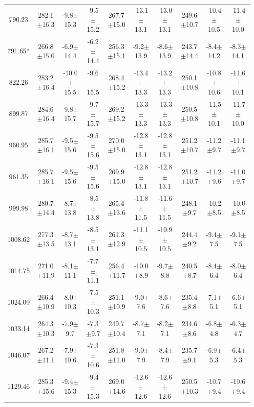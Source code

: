 \documentclass[agupp]{aguplus}              %
\begin{document}
\begin{article}
\begin{center}
\begin{table}[ht]
{\begin{tabular}{c|ccc|ccc|ccc}
790.23 & 282.1$\pm$16.3 & -9.8$\pm$15.3 & -9.5$\pm$15.2 & 267.7$\pm$15.0 & -13.1$\pm$13.1 & -13.0$\pm$13.1 & 249.6$\pm$10.7 & -10.4$\pm$10.5 & -11.4$\pm$10.0 \\ 
791.65* & 266.8$\pm$15.0 & -6.9$\pm$14.4 & -6.2$\pm$14.4 & 256.3$\pm$15.1 & -9.2$\pm$13.9 & -8.6$\pm$13.9 & 243.7$\pm$14.4 & -8.4$\pm$14.2 & -8.3$\pm$14.1 \\ 
\hline
822.26 & 283.2$\pm$16.4 & -10.0$\pm$15.5 & -9.6$\pm$15.5 & 268.4$\pm$15.2 & -13.4$\pm$13.3 & -13.2$\pm$13.3 & 250.1$\pm$10.8 & -10.8$\pm$10.6 & -11.6$\pm$10.1 \\ 
899.87 & 284.6$\pm$16.4 & -9.8$\pm$15.7 & -9.7$\pm$15.7 & 269.2$\pm$15.2 & -13.3$\pm$13.3 & -13.3$\pm$13.3 & 250.5$\pm$10.8 & -11.5$\pm$10.1 & -11.7$\pm$10.0 \\ 
960.95 & 285.7$\pm$16.1 & -9.5$\pm$15.6 & -9.5$\pm$15.6 & 270.0$\pm$15.0 & -12.8$\pm$13.1 & -12.8$\pm$13.1 & 251.2$\pm$10.7 & -11.2$\pm$9.7 & -11.1$\pm$9.7 \\ 
961.35 & 285.7$\pm$16.1 & -9.5$\pm$15.6 & -9.5$\pm$15.6 & 269.9$\pm$15.0 & -12.8$\pm$13.1 & -12.8$\pm$13.1 & 251.2$\pm$10.7 & -11.2$\pm$9.6 & -11.0$\pm$9.7 \\ 
\hline
999.98 & 280.7$\pm$14.4 & -8.7$\pm$13.8 & -8.5$\pm$13.8 & 265.4$\pm$13.6 & -11.8$\pm$11.5 & -11.6$\pm$11.5 & 248.1$\pm$9.7 & -10.2$\pm$8.5 & -10.0$\pm$8.5 \\ 
1008.62 & 277.3$\pm$13.5 & -8.7$\pm$13.1 & -8.5$\pm$13.1 & 261.3$\pm$12.9 & -11.1$\pm$10.5 & -10.9$\pm$10.5 & 244.4$\pm$9.2 & -9.4$\pm$7.5 & -9.1$\pm$7.5 \\ 
1014.75 & 271.0$\pm$11.9 & -8.1$\pm$11.1 & -7.7$\pm$11.1 & 256.4$\pm$11.7 & -10.0$\pm$8.9 & -9.7$\pm$8.8 & 240.5$\pm$8.7 & -8.4$\pm$6.4 & -8.0$\pm$6.4 \\ 
1024.09 & 266.4$\pm$10.9 & -8.0$\pm$10.3 & -7.5$\pm$10.3 & 251.1$\pm$10.9 & -9.0$\pm$7.6 & -8.6$\pm$7.6 & 235.4$\pm$8.8 & -7.1$\pm$5.1 & -6.6$\pm$5.1 \\ 
1033.14 & 264.3$\pm$10.3 & -7.9$\pm$9.7 & -7.3$\pm$9.7 & 249.7$\pm$10.4 & -8.7$\pm$7.1 & -8.2$\pm$7.1 & 234.6$\pm$8.6 & -6.8$\pm$4.8 & -6.3$\pm$4.7 \\ 
1046.07 & 267.2$\pm$11.1 & -7.9$\pm$10.6 & -7.3$\pm$10.6 & 251.8$\pm$11.0 & -9.0$\pm$7.9 & -8.4$\pm$7.9 & 235.7$\pm$9.1 & -6.9$\pm$5.3 & -6.4$\pm$5.3 \\ 
\hline
1129.46 & 285.3$\pm$15.6 & -9.4$\pm$15.3 & -9.4$\pm$15.3 & 269.0$\pm$14.6 & -12.6$\pm$12.6 & -12.6$\pm$12.6 & 250.5$\pm$10.3 & -10.7$\pm$9.4 & -10.6$\pm$9.4 \\ 

\end{tabular}}
\end{table}
\end{center}
\end{article}
\end{document}
